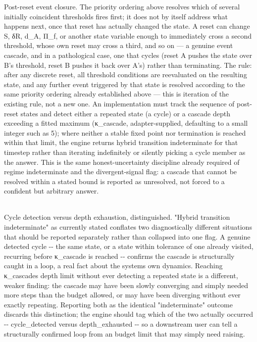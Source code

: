 \documentclass[
]{article}
\begin{document}
Post-reset event closure. The priority ordering above resolves which of
several initially coincident thresholds fires first; it does not by
itself address what happens next, once that reset has actually changed
the state. A reset can change S, δR, d\_A, Π\_f, or another state
variable enough to immediately cross a second threshold, whose own reset
may cross a third, and so on --- a genuine event cascade, and in a
pathological case, one that cycles (reset A pushes the state over B's
threshold, reset B pushes it back over A's) rather than terminating. The
rule: after any discrete reset, all threshold conditions are reevaluated
on the resulting state, and any further event triggered by that state is
resolved according to the same priority ordering already established
above --- this is iteration of the existing rule, not a new one. An
implementation must track the sequence of post-reset states and detect
either a repeated state (a cycle) or a cascade depth exceeding a fitted
maximum (κ\_cascade, adapter-supplied, defaulting to a small integer
such as 5); where neither a stable fixed point nor termination is
reached within that limit, the engine returns hybrid transition
indeterminate for that timestep rather than iterating indefinitely or
silently picking a cycle member as the answer. This is the same
honest-uncertainty discipline already required of regime indeterminate
and the divergent-signal flag: a cascade that cannot be resolved within
a stated bound is reported as unresolved, not forced to a confident but
arbitrary answer.\\
\strut \\
Cycle detection versus depth exhaustion, distinguished. "Hybrid
transition indeterminate" as currently stated conflates two
diagnostically different situations that should be reported separately
rather than collapsed into one flag. A genuine detected cycle -\/- the
same state, or a state within tolerance of one already visited,
recurring before κ\_cascade is reached -\/- confirms the cascade is
structurally caught in a loop, a real fact about the
system\textquotesingle s own dynamics. Reaching
κ\_cascade\textquotesingle s depth limit without ever detecting a
repeated state is a different, weaker finding: the cascade may have been
slowly converging and simply needed more steps than the budget allowed,
or may have been diverging without ever exactly repeating. Reporting
both as the identical "indeterminate" outcome discards this distinction;
the engine should tag which of the two actually occurred -\/-
cycle\_detected versus depth\_exhausted -\/- so a downstream user can
tell a structurally confirmed loop from an budget limit that may simply
need raising.
\end{document}
